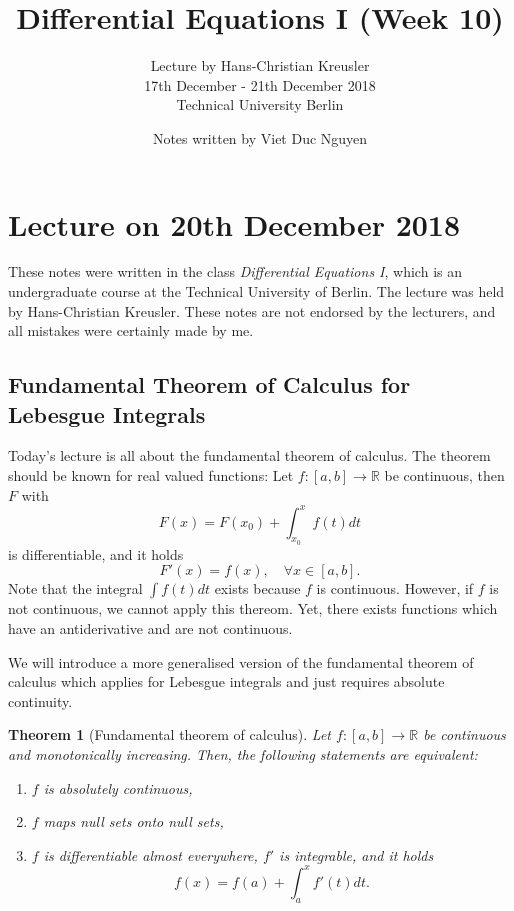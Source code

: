 \documentclass[a4paper, 11pt]{article}
\newtheorem{theorem}{Theorem}
\begin{document}
\title{Differential Equations I (Week 10) }
\author{ Lecture by Hans-Christian Kreusler \\ 17th December - 21th December 2018 \\ Technical University Berlin}
\date{ Notes written by Viet Duc Nguyen}
\maketitle



\section*{Lecture on 20th December 2018}
These notes were written in the class \emph{Differential Equations I}, which is an undergraduate course at the Technical University of Berlin. The lecture was held by Hans-Christian Kreusler. These notes are not endorsed by the lecturers, and all mistakes were certainly made by me.

\subsection*{Fundamental Theorem of Calculus for Lebesgue Integrals}
Today's lecture is all about the fundamental theorem of calculus. The theorem should be known for real valued functions: Let $f: [a,b] \to \mathbb R$ be continuous, then $F$ with
\[
	F(x) = F(x_0) + \int^x_{x_0}f(t)dt
\]
is differentiable, and it holds
\[
	F'(x) = f(x), \quad \forall x \in [a,b].
\]
Note that the integral $\int f(t)dt$ exists because $f$ is continuous. However, if $f$ is not continuous, we cannot apply this thereom. Yet, there exists functions which have an antiderivative and are not continuous. 

We will introduce a more generalised version of the fundamental theorem of calculus which applies for Lebesgue integrals and just requires absolute continuity.

\begin{theorem}[Fundamental theorem of calculus]
	Let $f:[a,b] \to \mathbb R$ be continuous and monotonically increasing. Then, the following statements are equivalent:
	\begin{enumerate}
		\item $f$ is absolutely continuous,
		\item $f$ maps null sets onto null sets,
		\item $f$ is differentiable almost everywhere, $f'$ is integrable, and it holds
		\[
			f(x) = f(a) + \int^x_{a}f'(t)dt.
		\]
	\end{enumerate}
\end{theorem} 
\end{document}
